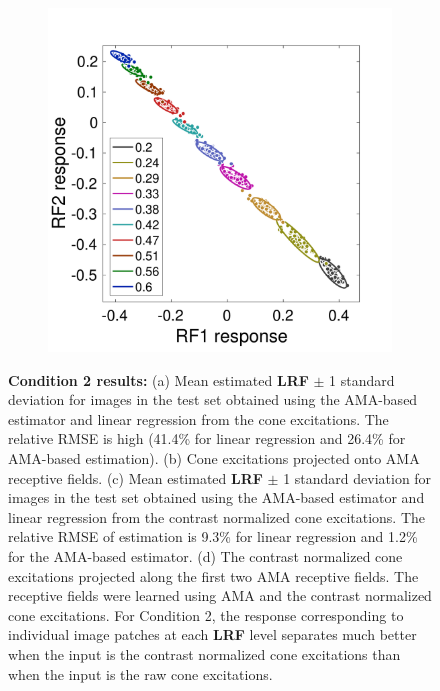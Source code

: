 \documentclass{jov}
\providecommand{\DIFaddtex}[1]{{\bf #1}} %
\providecommand{\DIFdeltex}[1]{} %
\providecommand{\DIFaddFL}[1]{\DIFadd{#1}} %
\providecommand{\DIFdelFL}[1]{\DIFdel{#1}} %
\providecommand{\DIFaddbeginFL}{} %
\providecommand{\DIFaddendFL}{} %
\providecommand{\DIFdelbeginFL}{} %
\providecommand{\DIFdelendFL}{} %
\providecommand{\DIFadd}[1]{\texorpdfstring{\DIFaddtex{#1}}{#1}} %
\providecommand{\DIFdel}[1]{\texorpdfstring{\DIFdeltex{#1}}{}} %
\newcommand{\DIFscaledelfig}{0.5}
\newlength{\DIFdelgraphicswidth} %
\newlength{\DIFdelgraphicsheight} %
\newcommand{\DIFaddincludegraphics}[2][]{{\color{blue}\fbox{\DIFOincludegraphics[#1]{#2}}}} %
\newcommand{\DIFdelincludegraphics}[2][]{%
\sbox{\DIFdelgraphicsbox}{\DIFOincludegraphics[#1]{#2}}%
\settoboxwidth{\DIFdelgraphicswidth}{\DIFdelgraphicsbox} %
\settoboxtotalheight{\DIFdelgraphicsheight}{\DIFdelgraphicsbox} %
\scalebox{\DIFscaledelfig}{%
\parbox[b]{\DIFdelgraphicswidth}{\usebox{\DIFdelgraphicsbox}\\[-\baselineskip] \rule{\DIFdelgraphicswidth}{0em}}\llap{\resizebox{\DIFdelgraphicswidth}{\DIFdelgraphicsheight}{%
\setlength{\unitlength}{\DIFdelgraphicswidth}%
\begin{picture}(1,1)%
\thicklines\linethickness{2pt} %
{\color[rgb]{1,0,0}\put(0,0){\framebox(1,1){}}}%
{\color[rgb]{1,0,0}\put(0,0){\line( 1,1){1}}}%
{\color[rgb]{1,0,0}\put(0,1){\line(1,-1){1}}}%
\end{picture}%
}\hspace*{3pt}}} %
} %
\DeclareRobustCommand{\DIFaddbeginFL}{\DIFOaddbeginFL \let\includegraphics\DIFaddincludegraphics} %
\DeclareRobustCommand{\DIFaddendFL}{\DIFOaddendFL \let\includegraphics\DIFOincludegraphics} %
\DeclareRobustCommand{\DIFdelbeginFL}{\DIFOdelbeginFL \let\includegraphics\DIFdelincludegraphics} %
\DeclareRobustCommand{\DIFdelendFL}{\DIFOaddendFL \let\includegraphics\DIFOincludegraphics} %
\begin{document}
\begin{figure}
\begin{subfigure}[b]{0.22 \textwidth}
        \includegraphics[width=\textwidth, trim={0 0 0 1.5cm},clip]{../FiguresDraft5/Figure11/Figure11_d.pdf}
        \label{fig:case2RFResponseContrast}
    \end{subfigure}
    \caption{{\bf Condition 2 results:} (a) Mean estimated \DIFdelbeginFL \DIFdelFL{LRV }\DIFdelendFL \DIFaddbeginFL \DIFaddFL{LRF }\DIFaddendFL $\pm$ 1 standard deviation for images in the test set obtained using the AMA-based estimator and linear regression from the cone excitations. The relative RMSE is high (41.4\% for linear regression and 26.4\% for AMA-based estimation). (b) Cone excitations projected onto AMA receptive fields. (c) Mean estimated \DIFdelbeginFL \DIFdelFL{LRV }\DIFdelendFL \DIFaddbeginFL \DIFaddFL{LRF }\DIFaddendFL $\pm$ 1 standard deviation for images in the test set obtained using the AMA-based estimator and linear regression from the contrast normalized cone excitations. The relative RMSE of estimation is 9.3\% for linear regression and 1.2\% for the AMA-based estimator. (d) The contrast normalized cone excitations projected along the first two AMA receptive fields. The receptive fields were learned using AMA and the contrast normalized cone excitations. For Condition 2, the response corresponding to individual image patches at each \DIFdelbeginFL \DIFdelFL{LRV }\DIFdelendFL \DIFaddbeginFL \DIFaddFL{LRF }\DIFaddendFL level separates much better when the input is the contrast normalized cone excitations than when the input is the raw cone excitations.}
\label{fig:Condition2}
\end{figure}
\end{document}
